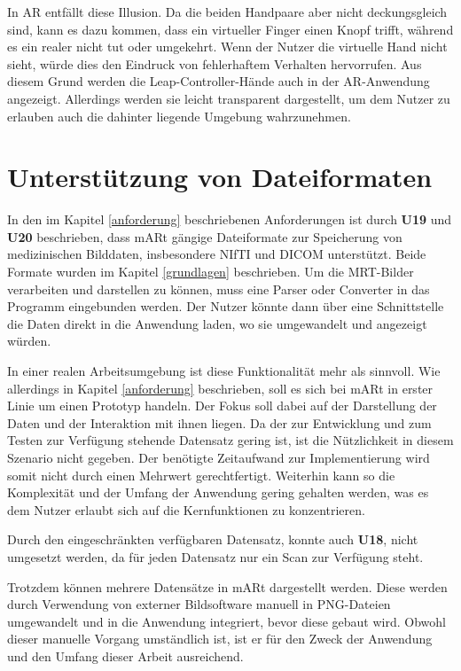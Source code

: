 In AR entfällt diese Illusion. Da die beiden Handpaare aber nicht deckungsgleich sind, kann es dazu kommen, dass ein virtueller Finger einen Knopf trifft, während es ein realer nicht tut oder umgekehrt. Wenn der Nutzer die virtuelle Hand nicht sieht, würde dies den Eindruck von fehlerhaftem Verhalten hervorrufen. 
Aus diesem Grund werden die Leap-Controller-Hände auch in der AR-Anwendung angezeigt. Allerdings werden sie leicht transparent dargestellt, um dem Nutzer zu erlauben auch die dahinter liegende Umgebung wahrzunehmen. 



\section{Unterstützung von Dateiformaten} 

In den im Kapitel \ref{anforderung} beschriebenen Anforderungen ist durch \textbf{U19} und \textbf{U20} beschrieben, dass mARt gängige Dateiformate zur Speicherung von medizinischen Bilddaten, insbesondere NIfTI und DICOM unterstützt. Beide Formate wurden im Kapitel \ref{grundlagen} beschrieben. 
Um die MRT-Bilder verarbeiten und darstellen zu können, muss eine Parser oder Converter in das Programm eingebunden werden. 
Der Nutzer könnte dann über eine Schnittstelle die Daten direkt in die Anwendung laden, wo sie umgewandelt und angezeigt würden. 

In einer realen Arbeitsumgebung ist diese Funktionalität mehr als sinnvoll. Wie allerdings in Kapitel \ref{anforderung} beschrieben, soll es sich bei mARt in erster Linie um einen Prototyp handeln.
Der Fokus soll dabei auf der Darstellung der Daten und der Interaktion mit ihnen liegen. Da der zur Entwicklung und zum Testen zur Verfügung stehende Datensatz gering ist, ist die Nützlichkeit in diesem Szenario nicht gegeben. Der benötigte Zeitaufwand zur Implementierung wird somit nicht durch einen Mehrwert gerechtfertigt.
Weiterhin kann so die Komplexität und der Umfang der Anwendung gering gehalten werden, was es dem Nutzer erlaubt sich auf die Kernfunktionen zu konzentrieren. 

Durch den eingeschränkten verfügbaren Datensatz, konnte auch \textbf{U18}, nicht umgesetzt werden, da für jeden Datensatz nur ein Scan zur Verfügung steht.


Trotzdem können mehrere Datensätze in mARt dargestellt werden. Diese werden durch Verwendung von externer Bildsoftware manuell in PNG-Dateien umgewandelt und in die Anwendung integriert, bevor diese gebaut wird. 
Obwohl dieser manuelle Vorgang umständlich ist, ist er für den Zweck der Anwendung und den Umfang dieser Arbeit ausreichend.
